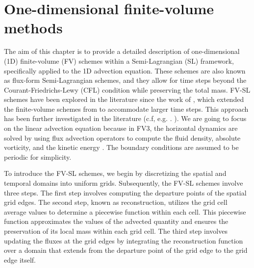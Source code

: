 \chapter{One-dimensional finite-volume methods}
\label{chp-1d-fv}

\theoremstyle{plain}
\newtheorem{lema}{Lemma}[chapter]

\theoremstyle{plain}
\newtheorem{prop}{Proposition}[chapter]

\theoremstyle{plain}
\newtheorem{thrm}{Theorem}[chapter]

\theoremstyle{plain}
\newtheorem{remark}{Remark}[chapter]

\theoremstyle{plain}
\newtheorem{corollary}{Corollary}[chapter]

\theoremstyle{plain}
\newtheorem{definition}{Definition}[chapter]


The aim of this chapter is to provide a detailed description of one-dimensional (1D) 
finite-volume (FV) schemes within a Semi-Lagrangian (SL) framework, specifically applied to 
the 1D advection equation.
These schemes are also known as flux-form Semi-Lagrangian schemes, and they allow for time steps beyond the 
Courant-Friedrichs-Lewy (CFL) condition while preserving the total mass.
FV-SL schemes have been explored in the literature since the work of  \citet{leveque:1985},
which extended the finite-volume schemes from \citet{godunov:1959}  to accommodate larger time steps.
This approach has been further investigated in the literature (c.f, e.g. . \citet{lin:1996,leonard:1996}).
We are going to focus on the linear advection equation because in FV3, the horizontal dynamics
are solved by using flux advection operators to compute the fluid density, absolute vorticity, 
and the kinetic energy \citep{lin:1997,putmanthesis:2007, harris:2013, harris:2021}.
The boundary conditions are assumed to be periodic for simplicity.

To introduce the FV-SL schemes, we begin by discretizing the spatial and temporal domains into uniform grids.
Subsequently, the FV-SL schemes involve three steps.
The first step involves computing the departure points of the spatial grid edges.
The second step, known as reconstruction, utilizes the grid cell average values to
determine a piecewise function within each cell. This piecewise function approximates the
values of the advected quantity and ensures the preservation of its local mass within each grid cell.
The third step involves updating the fluxes at the grid edges by integrating the reconstruction function 
over a domain that extends from the departure point of the grid edge to the grid edge itself.

